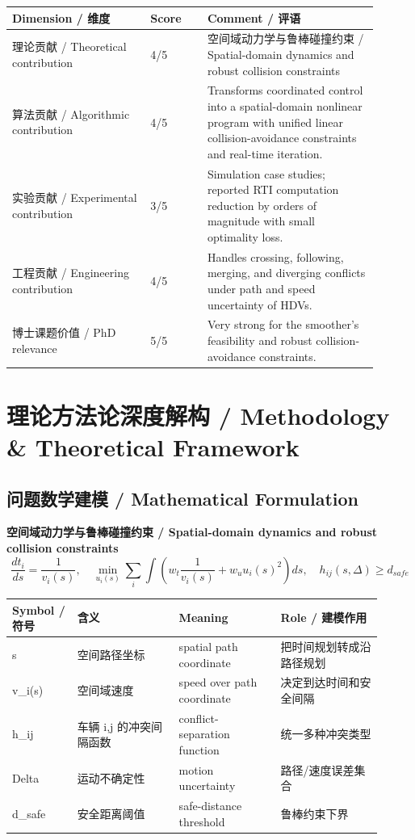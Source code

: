 \documentclass[UTF8,a4paper,11pt,fontset=fandol]{ctexart}
\begin{document}
\begin{longtable}{p{0.34\linewidth}p{0.14\linewidth}p{0.42\linewidth}}
\toprule
Dimension / 维度 & Score & Comment / 评语\\
\midrule
理论贡献 / Theoretical contribution & 4/5 & 空间域动力学与鲁棒碰撞约束 / Spatial-domain dynamics and robust collision constraints \\
算法贡献 / Algorithmic contribution & 4/5 & Transforms coordinated control into a spatial-domain nonlinear program with unified linear collision-avoidance constraints and real-time iteration. \\
实验贡献 / Experimental contribution & 3/5 & Simulation case studies; reported RTI computation reduction by orders of magnitude with small optimality loss. \\
工程贡献 / Engineering contribution & 4/5 & Handles crossing, following, merging, and diverging conflicts under path and speed uncertainty of HDVs. \\
博士课题价值 / PhD relevance & 5/5 & Very strong for the smoother's feasibility and robust collision-avoidance constraints. \\
\bottomrule
\end{longtable}

\section{理论方法论深度解构 / Methodology \& Theoretical Framework}
\subsection{问题数学建模 / Mathematical Formulation}
\textbf{空间域动力学与鲁棒碰撞约束 / Spatial-domain dynamics and robust collision constraints}
\[
\frac{dt_i}{ds}=\frac{1}{v_i(s)},\quad \min_{u_i(s)}\sum_i\int \left(w_t\frac{1}{v_i(s)}+w_u u_i(s)^2\right)ds,\quad h_{ij}(s,\Delta)\ge d_{safe}
\]
\begin{longtable}{p{0.16\linewidth}p{0.25\linewidth}p{0.25\linewidth}p{0.25\linewidth}}
\toprule
Symbol / 符号 & 含义 & Meaning & Role / 建模作用\\
\midrule
s & 空间路径坐标 & spatial path coordinate & 把时间规划转成沿路径规划 \\
v\_i(s) & 空间域速度 & speed over path coordinate & 决定到达时间和安全间隔 \\
h\_ij & 车辆 i,j 的冲突间隔函数 & conflict-separation function & 统一多种冲突类型 \\
Delta & 运动不确定性 & motion uncertainty & 路径/速度误差集合 \\
d\_safe & 安全距离阈值 & safe-distance threshold & 鲁棒约束下界 \\
\bottomrule
\end{longtable}
\end{document}
